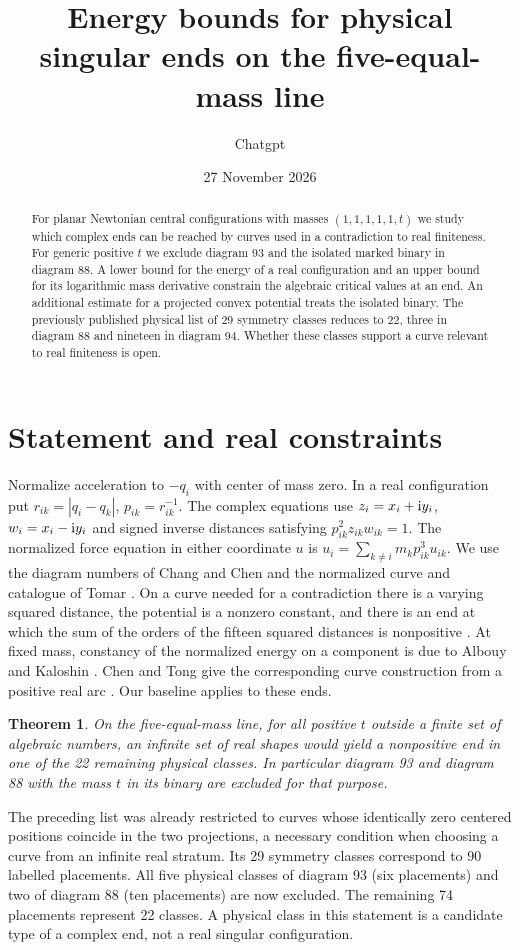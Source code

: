 \documentclass[11pt]{article}
\title{Energy bounds for physical singular ends on the five-equal-mass line}
\author{Chatgpt}
\date{27 November 2026}
\newtheorem{theorem}{Theorem}
\begin{document}
\maketitle
\begin{abstract}
For planar Newtonian central configurations with masses $(1,1,1,1,1,t)$ we study which complex ends can be reached by curves used in a contradiction to real finiteness. For generic positive $t$ we exclude diagram 93 and the isolated marked binary in diagram 88. A lower bound for the energy of a real configuration and an upper bound for its logarithmic mass derivative constrain the algebraic critical values at an end. An additional estimate for a projected convex potential treats the isolated binary. The previously published physical list of 29 symmetry classes reduces to 22, three in diagram 88 and nineteen in diagram 94. Whether these classes support a curve relevant to real finiteness is open.
\end{abstract}
\section{Statement and real constraints}
Normalize acceleration to $-q_i$ with center of mass zero. In a real configuration put $r_{ik}=|q_i-q_k|$, $p_{ik}=r_{ik}^{-1}$. The complex equations use $z_i=x_i+{\rm i}y_i$, $w_i=x_i-{\rm i}y_i$ and signed inverse distances satisfying $p_{ik}^2z_{ik}w_{ik}=1$. The normalized force equation in either coordinate $u$ is $u_i=\sum_{k\ne i}m_kp_{ik}^3u_{ik}$. We use the diagram numbers of Chang and Chen \cite{CC} and the normalized curve and catalogue of Tomar \cite{Tomar}. On a curve needed for a contradiction there is a varying squared distance, the potential is a nonzero constant, and there is an end at which the sum of the orders of the fifteen squared distances is nonpositive \cite[Corollaries 2.4 and 2.7]{Tomar}. At fixed mass, constancy of the normalized energy on a component is due to Albouy and Kaloshin \cite[Lemma~2]{AK}. Chen and Tong give the corresponding curve construction from a positive real arc \cite[Lemmas~2.1--2.2]{CT}. Our baseline \cite{Prior} applies to these ends.
\begin{theorem}
On the five-equal-mass line, for all positive $t$ outside a finite set of algebraic numbers, an infinite set of real shapes would yield a nonpositive end in one of the 22 remaining physical classes. In particular diagram 93 and diagram 88 with the mass $t$ in its binary are excluded for that purpose.
\end{theorem}
The preceding list was already restricted to curves whose identically zero centered positions coincide in the two projections, a necessary condition when choosing a curve from an infinite real stratum. Its 29 symmetry classes correspond to 90 labelled placements. All five physical classes of diagram 93 (six placements) and two of diagram 88 (ten placements) are now excluded. The remaining 74 placements represent 22 classes. A physical class in this statement is a candidate type of a complex end, not a real singular configuration.
\end{document}
